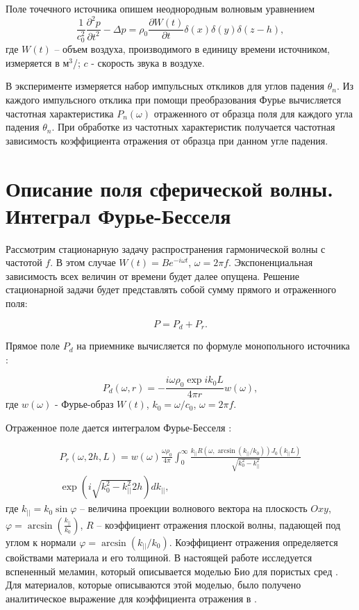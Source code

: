 Поле точечного источника опишем неоднородным волновым уравнением
\begin{equation}
\label{eq:waveequation}
\frac{1}{c_0^2} \frac{\partial^2 p}{\partial t^2} - \Delta p = \rho_0 \frac{\partial W(t)}{\partial t} \delta(x) \delta(y) \delta(z-h),
\end{equation}
где $W(t)$ – объем воздуха, производимого в единицу времени источником, измеряется в $\text{м}^3$/; $c$ - скорость звука в воздухе.

В эксперименте измеряется набор импульсных откликов для углов падения $\theta_n$. Из каждого импульсного отклика при помощи преобразования Фурье вычисляется частотная характеристика $P_n(\omega)$ отраженного от образца поля для каждого угла падения $\theta_n$. При обработке из частотных характеристик получается частотная зависимость коэффициента отражения от образца при данном угле падения.

\section{Описание поля сферической волны. Интеграл Фурье-Бесселя}

Рассмотрим стационарную задачу распространения гармонической волны с частотой $f$. В этом случае $W(t) = Be^{-i\omega t}$, $\omega = 2\pi f$. Экспоненциальная зависимость всех величин от времени будет далее опущена. Решение стационарной задачи будет представлять собой сумму прямого и отраженного поля:

\begin{equation}
P = P_d + P_r.
\end{equation}

Прямое поле $P_d$ на приемнике вычисляется по формуле монопольного источника \cite{Isakovich1973}:

\begin{equation}
\label{eq:pointsource}
P_d(\omega, r) = - \frac{i\omega\rho_0 \exp{i k_0 L}}{4 \pi r} w(\omega),
\end{equation}
где $w(\omega)$ - Фурье-образ $W(t)$, $k_0 = \omega / c_0$, $\omega = 2 \pi f$.

Отраженное поле дается интегралом Фурье-Бесселя \cite{Biot1956_I, Biot1956_II}:

\begin{multline}
\label{eq:reflectedfield}
P_r(\omega, 2h, L) = w(\omega) \frac{\omega \rho_0}{4 \pi} \int_{0}^{\infty} \frac{k_{||} R(\omega, \arcsin(k_{||}/k_0) ) J_0(k_{||}L)}{\sqrt{k_0^2 - k_{||}^2}} \\
 \exp(i \sqrt{k_0^2 - k_{||}^2} 2h) dk_{||},
\end{multline}  
где $k_{||} = k_0 \sin\varphi$ – величина проекции волнового вектора на плоскость $Oxy$, $\varphi = \arcsin\left(\frac{k_{||}}{k_0}\right)$, $R$ – коэффициент отражения плоской волны, падающей под углом к нормали $\varphi = \arcsin(k_{||}/k_0)$. Коэффициент отражения определяется свойствами материала и его толщиной. В настоящей работе исследуется вспененный меламин, который описывается моделью Био для пористых сред \cite{Biot1956_I, Biot1956_II}. Для материалов, которые описываются этой моделью, было получено аналитическое выражение для коэффициента отражения в \cite{Allard2009}.

